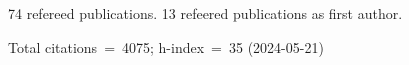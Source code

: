 74 refereed publications. 13 refeered publications as first author.

Total citations~=~4075; h-index~=~35 (2024-05-21)